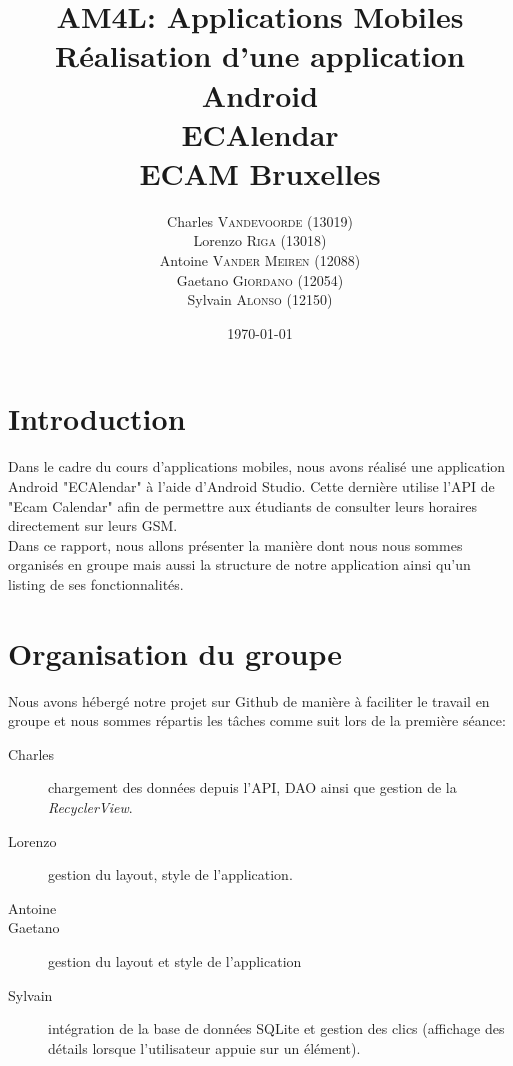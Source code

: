 \documentclass{article}
\title{AM4L: Applications Mobiles \\ Réalisation d'une application Android \\ ECAlendar \\
\vspace{1cm} \large{ECAM Bruxelles} \vspace{5cm}}
\author{Charles \textsc{Vandevoorde} (13019)\\
		Lorenzo \textsc{Riga} (13018)\\
		Antoine \textsc{Vander Meiren} (12088)\\
		Gaetano \textsc{Giordano} (12054)\\
		Sylvain \textsc{Alonso} (12150)\\}
\date{\vspace{5cm}\today}
\begin{document}
	\maketitle
    \newpage


	\section{Introduction}
    Dans le cadre du cours d'applications mobiles, nous avons réalisé une application Android
    "ECAlendar" à l'aide d'Android Studio. Cette dernière utilise l'API de "Ecam Calendar" afin de
    permettre aux étudiants de consulter leurs horaires directement sur leurs GSM.\\

    Dans ce rapport, nous allons présenter la manière dont nous nous sommes organisés en groupe mais
    aussi la structure de notre application ainsi qu'un listing de ses fonctionnalités.

	\section{Organisation du groupe}
	\hspace{0.45cm}
     Nous avons hébergé notre projet sur Github de manière à faciliter le travail en groupe et nous
     sommes répartis les tâches comme suit lors de la première séance:
	 \begin{description}
         \item[Charles] chargement des données depuis l'API, DAO ainsi que gestion de la
             \textit{RecyclerView}.
         \item[Lorenzo] gestion du layout, style de l'application.
         \item[Antoine]
         \item[Gaetano] gestion du layout et style de l'application
         \item[Sylvain] intégration de la base de données SQLite et gestion des clics (affichage des détails lorsque l'utilisateur appuie sur un élément).
	 \end{description}
\end{document}
